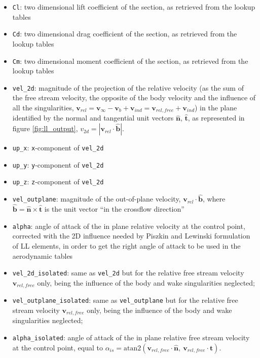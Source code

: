 \begin{itemize}
    \item \texttt{Cl}: two dimensional lift coefficient of the section, 
    as retrieved from the lookup tables
    \item \texttt{Cd}: two dimensional drag coefficient of the section, 
    as retrieved from the lookup tables
    \item \texttt{Cm}: two dimensional moment coefficient of the section, 
    as retrieved from the lookup tables
    \item \texttt{vel\_2d}: magnitude of the projection of the relative 
    velocity (as the sum of the free stream velocity, the opposite of 
    the body velocity and the influence of all the singularities, 
    $\mathbf{v}_{rel} = \mathbf{v}_\infty - \mathbf{v}_b + 
    \mathbf{v}_{ind} = \mathbf{v}_{rel,free} + \mathbf{v}_{ind}$) 
    in the plane identified by the normal and tangential unit vectors 
    $\mathbf{\hat{n}}$, $\mathbf{\hat{t}}$, as represented in figure \ref{fig:ll_output},
    $v_{2d} = | \mathbf{v}_{rel} \cdot \mathbf{\hat{b}}|$.
    \item \texttt{up\_x}: \texttt{x}-component of \texttt{vel\_2d} 
    \item \texttt{up\_y}: \texttt{y}-component of \texttt{vel\_2d}
    \item \texttt{up\_z}: \texttt{z}-component of \texttt{vel\_2d}  
    \item \texttt{vel\_outplane}: magnitude of the out-of-plane velocity, 
    $\mathbf{v}_{rel} \cdot \mathbf{\hat{b}}$, where 
    $\mathbf{\hat{b}} = \mathbf{\hat{n}} \times \mathbf{\hat{t}}$ 
    is the unit vector ``in the crossflow direction''
    \item \texttt{alpha}: angle of attack of the in plane relative 
    velocity at the control point, corrected with the 2D influence 
    needed by Piszkin and Lewinski formulation of LL elements, 
    in order to get the right angle of attack to be used in the 
    aerodynamic tables
    \item \texttt{vel\_2d\_isolated}: same as \texttt{vel\_2d} but 
    for the relative free stream velocity $\mathbf{v}_{rel,free}$ only,
    being the influence of the body and wake singularities neglected;
    \item \texttt{vel\_outplane\_isolated}: same as \texttt{vel\_outplane} 
    but for the relative free stream velocity $\mathbf{v}_{rel,free}$ only, 
    being the influence of the body and wake singularities neglected;
    \item \texttt{alpha\_isolated}: angle of attack of the in plane relative 
    free stream velocity at the control point, equal to 
    $\alpha_{is} = \text{atan2}( \mathbf{v}_{rel,free} \cdot \mathbf{\hat{n}}, 
    \ \mathbf{v}_{rel,free} \cdot \mathbf{\hat{t}})$.
\end{itemize}
